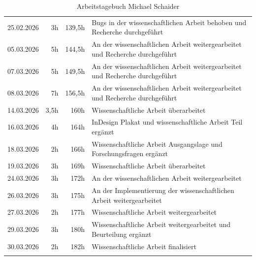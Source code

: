 \begin{longtable}{r | r | r | p{}}
    25.02.2026 & 3h & 139,5h & Bugs in der wissenschaftlichen Arbeit behoben und Recherche durchgeführt \\
    05.03.2026 & 5h & 144,5h & An der wissenschaftlichen Arbeit weitergearbeitet und Recherche durchgeführt \\
    07.03.2026 & 5h & 149,5h & An der wissenschaftlichen Arbeit weitergearbeitet und Recherche durchgeführt \\
    08.03.2026 & 7h & 156,5h & An der wissenschaftlichen Arbeit weitergearbeitet und Recherche durchgeführt \\
    14.03.2026 & 3,5h & 160h & Wissenschaftliche Arbeit überarbeitet \\
    16.03.2026 & 4h & 164h & InDesign Plakat und wissenschaftliche Arbeit Teil ergänzt \\
    18.03.2026 & 2h & 166h & Wissenschaftliche Arbeit Ausgangslage und Forschungsfragen ergänzt \\
    19.03.2026 & 3h & 169h & Wissenschaftliche Arbeit überarbeitet \\
    24.03.2026 & 3h & 172h & An der wissenschaftlichen Arbeit weitergearbeitet \\
    26.03.2026 & 3h & 175h & An der Implementierung der wissenschaftlichen Arbeit weitergearbeitet \\
    27.03.2026 & 2h & 177h & Wissenschaftliche Arbeit weitergearbeitet \\
    29.03.2026 & 3h & 180h & Wissenschaftliche Arbeit weitergearbeitet und Beurteilung ergänzt \\
    30.03.2026 & 2h & 182h & Wissenschaftliche Arbeit finalisiert \\ \hline

    \caption{Arbeitstagebuch Michael Schaider} \label{tab:arbeitstagebuch_michael}
\end{longtable}
